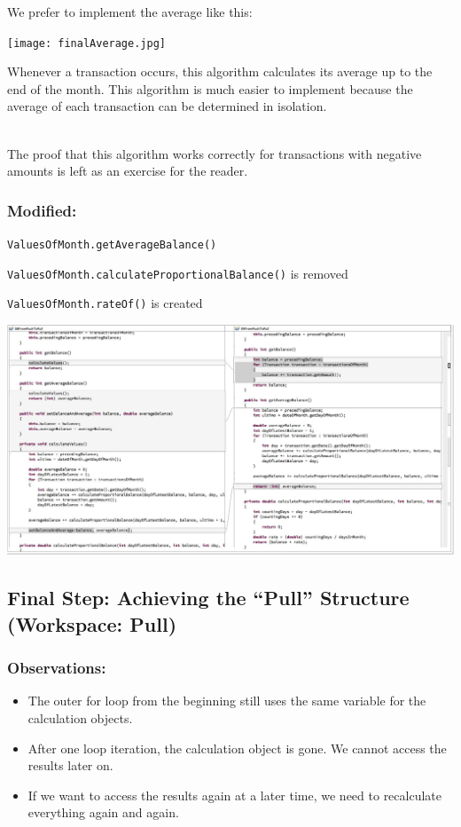 \documentclass[a4paper,fleqn,titlepage,11pt]{article}
\begin{document}
We prefer to implement the average like this:

\texttt{[image: finalAverage.jpg]}

Whenever a transaction occurs, this algorithm calculates its average up to the end of the month. This algorithm is much easier to implement because the average of each transaction can be determined in isolation.
\\~

The proof that this algorithm works correctly for transactions with negative amounts is left as an exercise for the reader.

\subsubsection*{Modified:}

\texttt{ValuesOfMonth.getAverageBalance()}

\texttt{ValuesOfMonth.calculateProportionalBalance()} is removed

\texttt{ValuesOfMonth.rateOf()} is created

\includegraphics[width=1\textwidth]{CompareViews/08-09.jpg}


\subsection*{Final Step: Achieving the ``Pull'' Structure (Workspace: Pull)}

\subsubsection*{Observations:}

\begin{itemize}
\item The outer for loop from the beginning still uses the same variable for the calculation objects.
\item After one loop iteration, the calculation object is gone. We cannot access the results later on.
\item If we want to access the results again at a later time, we need to recalculate everything again and again.
\end{itemize}
\end{document}

